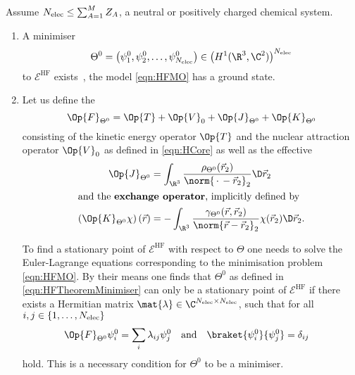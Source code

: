 \begin{thm}
	\label{thm:MathematicalHF}
	Assume $N_\text{elec} \leq \sum_{A=1}^M Z_A$, \ie a neutral or positively charged chemical system.
	\begin{enumerate}[label=(\alph*)]
		\item A minimiser
			\begin{equation}
				\Theta^0 = \left(\psi_1^0, \psi_2^0, \ldots, \psi_{\Nelec}^0 \right)
					\in \left( H^1(\R^3, \C^2) \right)^{\Nelec}
				\label{eqn:HFTheoremMinimiser}
			\end{equation}
			to $\mathcal{E}^\text{HF}$ exists~\cite{Lieb1977},
			\ie the \HF model \eqref{eqn:HFMO} has a ground state.
		\item Let us define the 
			\begin{equation}
				\Op{F}_{\Theta^0} = \Op{T} + \Op{V}_0 + \Op{J}_{\Theta^0} + \Op{K}_{\Theta^0}
				\label{eqn:FockOperator}
			\end{equation}
			consisting of the kinetic energy operator $\Op{T}$ and
			the nuclear attraction operator $\Op{V}_0$ as defined in \eqref{eqn:HCore}
			as well as the effective 
			\begin{align}
				\label{eqn:OperatorCoulomb}
					\Op{J}_{\Theta^0} &= \int_{\R^3} \frac{\rho_{\Theta^0}(\vec{r}_2)}
						{\norm{\slot - \vec{r}_2}_2} \D \vec{r}_2 \\
				\intertext{and the \newterm{exchange operator}, implicitly defined by}
					\left( \Op{K}_{\Theta^0} \chi \right)(\vec{r})
					&= - \int_{\R^3} \frac{\gamma_{\Theta^0}(\vec{r}, \vec{r}_2)}
						{\norm{\vec{r} - \vec{r}_2}_2} \chi(\vec{r}_2) \D \vec{r}_2.
				\label{eqn:OperatorExchange}
			\end{align}

			To find a stationary point of $\mathcal{E}^\text{HF}$ with respect to $\Theta$
			one needs to solve the Euler-Lagrange equations corresponding to the minimisation
			problem \eqref{eqn:HFMO}.
			By their means one finds that $\Theta^0$
			as defined in \eqref{eqn:HFTheoremMinimiser}
			can only be a stationary point of $\mathcal{E}^\text{HF}$ if
			there exists a Hermitian matrix $\mat{\lambda} \in \C^{\Nelec\times\Nelec}$,
			such that for all $i,j \in \{1,\ldots,N_\text{elec}\}$
			\begin{align}
				\label{eqn:EulerLagrangeHF}
				\Op{F}_{\Theta^0} \psi_i^0 &= \sum_{i} \lambda_{ij} \psi_j^0
				&&\text{and}&
				\braket{\psi_i^0}{\psi_j^0} &= \delta_{ij}
			\end{align}
			hold.
			This is a necessary condition for $\Theta^0$ to be a minimiser.


\end{enumerate}
\end{thm}

